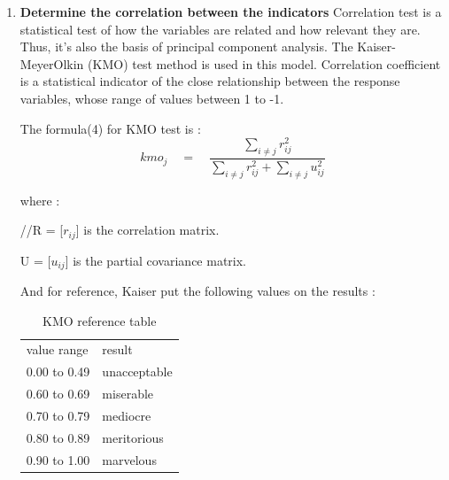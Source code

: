 \documentclass{mcmthesis}
\begin{document}
\begin{enumerate}
          \item \textbf{Determine the correlation between the indicators}
              Correlation test is a statistical test of how the variables are related and how relevant they are. Thus, it’s also the basis of principal component analysis. The Kaiser-MeyerOlkin (KMO) test method is used in this model. Correlation coefficient is a statistical indicator of the close relationship between the response variables, whose range of values between 1 to -1.

              The formula(4) for KMO test is :
              $${ kmo }_{ j }\quad =\quad \frac { \sum _{ i\neq j }^{  }{ { r }_{ ij }^{ 2 } }  }{ \sum _{ i\neq j }^{  }{ { r }_{ ij }^{ 2 } } +\sum _{ i\neq j }^{  }{ { u }_{ ij }^{ 2 } }  }$$

              where :

              //R = [$r_{ij}$] is the correlation matrix.

              U = [$u_{ij}$] is the partial covariance matrix.

              And for reference, Kaiser put the following values on the results :

              \begin{table}[!hbpt]
                \centering
                \begin{tabular}{l|l}
                  \hline
                  value range & result \\
                  0.00 to 0.49 & unacceptable \\
                  0.60 to 0.69 & miserable \\
                  0.70 to 0.79 & mediocre \\
                  0.80 to 0.89 & meritorious \\
                  0.90 to 1.00 & marvelous \\
                  \hline
                \end{tabular}
                \caption{KMO reference table}
              \end{table}
        \end{enumerate}
        
        
        
        
       
              
\end{document}
